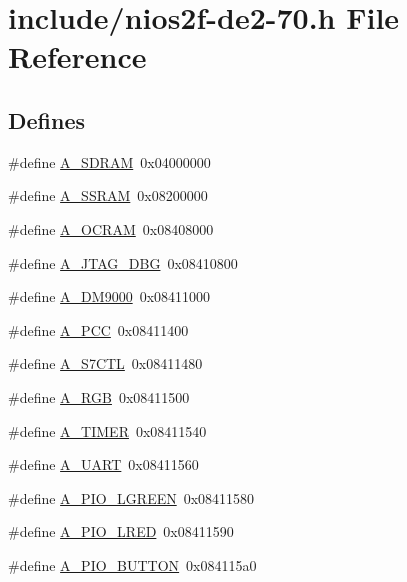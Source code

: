 \hypertarget{nios2f-de2-70_8h}{\section{include/nios2f-\/de2-\/70.h \-File \-Reference}
\label{nios2f-de2-70_8h}
}
\subsection*{\-Defines}
\begin{DoxyCompactItemize}
\item 
\#define \hyperlink{nios2f-de2-70_8h_ae16e22cad4f4c749f8cfbbf4e6694613}{\-A\-\_\-\-S\-D\-R\-A\-M}~0x04000000
\item 
\#define \hyperlink{nios2f-de2-70_8h_abc352df37aaf7a17f03533e3720ebd59}{\-A\-\_\-\-S\-S\-R\-A\-M}~0x08200000
\item 
\#define \hyperlink{nios2f-de2-70_8h_a931fbb6ac1b6a15a7b6965823e86498e}{\-A\-\_\-\-O\-C\-R\-A\-M}~0x08408000
\item 
\#define \hyperlink{nios2f-de2-70_8h_abe25df7a188c4b5dda1bb18d8a4b934a}{\-A\-\_\-\-J\-T\-A\-G\-\_\-\-D\-B\-G}~0x08410800
\item 
\#define \hyperlink{nios2f-de2-70_8h_a46f19e8623e6876969363498b5561dc9}{\-A\-\_\-\-D\-M9000}~0x08411000
\item 
\#define \hyperlink{nios2f-de2-70_8h_ab5ea5dff0f4ec1e5721e3044513ddde0}{\-A\-\_\-\-P\-C\-C}~0x08411400
\item 
\#define \hyperlink{nios2f-de2-70_8h_a115ec6ad877861a03b53cba093c6db6e}{\-A\-\_\-\-S7\-C\-T\-L}~0x08411480
\item 
\#define \hyperlink{nios2f-de2-70_8h_ab9dc0b242151dc27db0f75c0ea84c985}{\-A\-\_\-\-R\-G\-B}~0x08411500
\item 
\#define \hyperlink{nios2f-de2-70_8h_a7ca7452dfe7689d7cae8ffb69e2a4963}{\-A\-\_\-\-T\-I\-M\-E\-R}~0x08411540
\item 
\#define \hyperlink{nios2f-de2-70_8h_afc58b0f18b0e3d72ecab1596b72e7df0}{\-A\-\_\-\-U\-A\-R\-T}~0x08411560
\item 
\#define \hyperlink{nios2f-de2-70_8h_a49f525094b5a55e172c079cb6ee02d23}{\-A\-\_\-\-P\-I\-O\-\_\-\-L\-G\-R\-E\-E\-N}~0x08411580
\item 
\#define \hyperlink{nios2f-de2-70_8h_a7bfc463517370b532e6b193c4687c401}{\-A\-\_\-\-P\-I\-O\-\_\-\-L\-R\-E\-D}~0x08411590
\item 
\#define \hyperlink{nios2f-de2-70_8h_a31e8543437aebcaf6b847c56d2e0e721}{\-A\-\_\-\-P\-I\-O\-\_\-\-B\-U\-T\-T\-O\-N}~0x084115a0

\end{DoxyCompactItemize}
